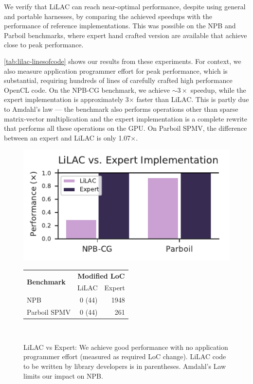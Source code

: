 We verify that LiLAC can reach near-optimal performance, despite using general
and portable harnesses, by comparing the achieved speedups with the performance
of reference implementations.
This was possible on the NPB and Parboil benchmarks, where expert hand
crafted version are available that achieve close to peak performance.


\autoref{tab:lilac-linesofcode} shows our results from these experiments.
For context, we also measure application programmer effort for peak performance,
which is substantial, requiring hundreds of lines of carefully crafted
high performance OpenCL code.
On the NPB-CG benchmark, we achieve $\sim 3\times$ speedup,
while the expert implementation is approximately 3$\times$ faster than LiLAC.
This is partly due to Amdahl's law --- the benchmark also performs operations
other than sparse matrix-vector multiplication and the expert implementation is
a complete rewrite that performs all these operations on the GPU.
On Parboil SPMV, the difference between an expert and LiLAC is only
1.07$\times$.

\begin{figure}[t]
  \centering
  \includegraphics[width=0.9\columnwidth,height=0.5\columnwidth]{figures/expert.pdf}
\\[0.5em]
  \begin{tabular}{lrr}
    \multirow{2}{*}{\textbf{Benchmark}} & \multicolumn{2}{c}{\textbf{Modified LoC}} \\
    & LiLAC & Expert \\
    \toprule
    \toprule
    NPB          & 0 (44) & 1948 \\
    Parboil SPMV & 0 (44) & 261
  \end{tabular}
\\[0.45em]
  \caption{LiLAC vs Expert: We achieve good performance with no application
           programmer effort (measured as required LoC change).
           LiLAC code to be written by library developers is in parentheses.
           Amdahl's Law limits our impact on NPB.
}
  \label{tab:lilac-linesofcode}
\end{figure}

